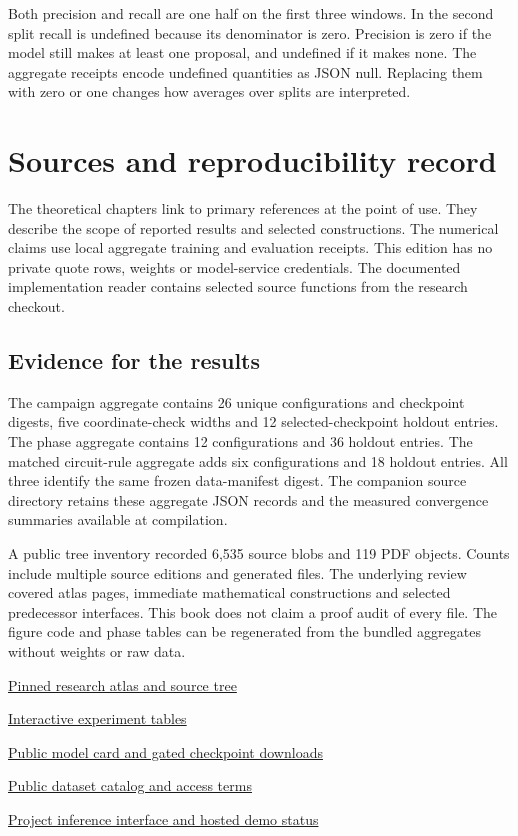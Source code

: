 \documentclass[11pt,oneside,openany]{book}
\begin{document}
Both precision and recall are one half on the first three windows. In the second split recall is undefined because its denominator is zero. Precision is zero if the model still makes at least one proposal, and undefined if it makes none. The aggregate receipts encode undefined quantities as JSON null. Replacing them with zero or one changes how averages over splits are interpreted.

\chapter{Sources and reproducibility record}
The theoretical chapters link to primary references at the point of use. They describe the scope of reported results and selected constructions. The numerical claims use local aggregate training and evaluation receipts. This edition has no private quote rows, weights or model-service credentials. The documented implementation reader contains selected source functions from the research checkout.

\section*{Evidence for the results}
The campaign aggregate contains 26 unique configurations and checkpoint digests, five coordinate-check widths and 12 selected-checkpoint holdout entries. The phase aggregate contains 12 configurations and 36 holdout entries. The matched circuit-rule aggregate adds six configurations and 18 holdout entries. All three identify the same frozen data-manifest digest. The companion source directory retains these aggregate JSON records and the measured convergence summaries available at compilation.

A public tree inventory recorded 6,535 source blobs and 119 PDF objects. Counts include multiple source editions and generated files. The underlying review covered atlas pages, immediate mathematical constructions and selected predecessor interfaces. This book does not claim a proof audit of every file. The figure code and phase tables can be regenerated from the bundled aggregates without weights or raw data.

{\small\sffamily\href{https://github.com/amelie-iska/GRH-research/tree/e941b50772fb5aff322644badfbe9fb260b4d46c}{Pinned research atlas and source tree}\par}
{\small\sffamily\href{https://amelie-iska.github.io/phaseweave-lab/results.html}{Interactive experiment tables}\par}
{\small\sffamily\href{https://huggingface.co/AmelieSchreiber/PhaseWeave-FX-Pilot}{Public model card and gated checkpoint downloads}\par}
{\small\sffamily\href{https://huggingface.co/datasets/AmelieSchreiber/PhaseWeave-FX-Windows-Catalog}{Public dataset catalog and access terms}\par}
{\small\sffamily\href{https://amelie-iska.github.io/phaseweave-lab/#inference}{Project inference interface and hosted demo status}\par}
\end{document}
